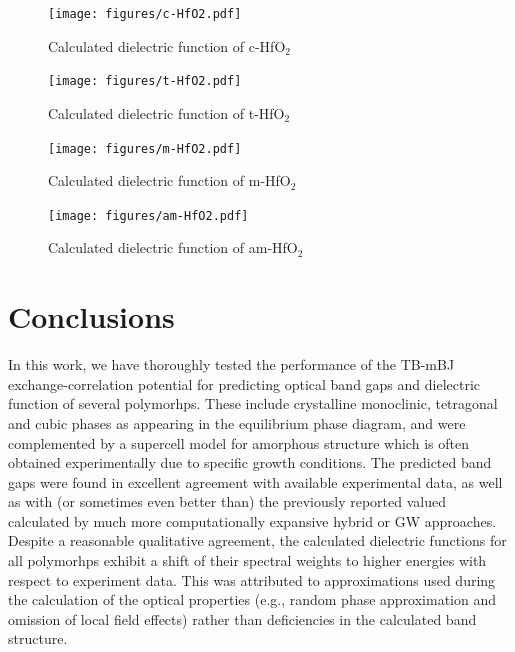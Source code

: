 \documentclass[10pt,a4paper,twocolumn]{article}
\begin{document}

\begin{figure}
\begin{center}
	\texttt{[image: figures/c-HfO2.pdf]}
	\caption{Calculated dielectric function of c-HfO$_2$}
   \label{eps-cHfO2}
\end{center}
\end{figure}

\begin{figure}
\begin{center}
	\texttt{[image: figures/t-HfO2.pdf]}
	\caption{Calculated dielectric function of t-HfO$_2$}
   \label{eps-tHfO2}
\end{center}
\end{figure}

\begin{figure}
\begin{center}
	\texttt{[image: figures/m-HfO2.pdf]}
	\caption{Calculated dielectric function of m-HfO$_2$}
   \label{eps-mHfO2}
\end{center}
\end{figure}

\begin{figure}
\begin{center}
	\texttt{[image: figures/am-HfO2.pdf]}
	\caption{Calculated dielectric function of am-HfO$_2$}
   \label{eps-amHfO2}
\end{center}
\end{figure}


\section{Conclusions}

In this work, we have thoroughly tested the performance of the TB-mBJ exchange-correlation potential for predicting optical band gaps and dielectric function of several  polymorhps.
These include crystalline monoclinic, tetragonal and cubic phases as appearing in the equilibrium phase diagram, and were complemented by a supercell model for amorphous structure which is often obtained experimentally due to specific growth conditions.
The predicted band gaps were found in excellent agreement with available experimental data, as well as with (or sometimes even better than) the previously reported valued calculated by much more computationally expansive hybrid or GW approaches.
Despite a reasonable qualitative agreement, the calculated dielectric functions for all polymorhps exhibit a shift of their spectral weights to higher energies with respect to experiment data.
This was attributed to approximations used during the calculation of the optical properties (e.g., random phase approximation and omission of local field effects) rather than deficiencies in the calculated band structure.
  
\end{document}
